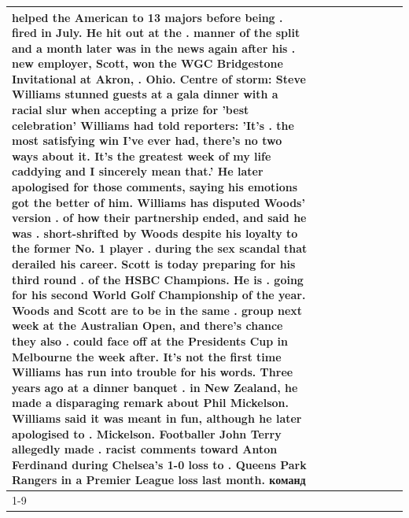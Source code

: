 \begin{table}[H]
\begin{tabular}{lllrlllll}
helped the American to 13 majors before being . fired in July. He hit out at the . manner of the split and a month later was in the news again after his . new employer, Scott, won the WGC Bridgestone Invitational at Akron, . Ohio. Centre of storm: Steve Williams stunned guests at a gala dinner with a racial slur when accepting a prize for 'best celebration' Williams had told reporters: 'It's . the most satisfying win I've ever had, there's no two ways about it. It's the greatest week of my life caddying and I sincerely mean that.' He later apologised for those comments, saying his emotions got the better of him. Williams has disputed Woods' version . of how their partnership ended, and said he was . short-shrifted by Woods despite his loyalty to the former No. 1 player . during the sex scandal that derailed his career. Scott is today preparing for his third round . of the HSBC Champions. He is . going for his second World Golf Championship of the year. Woods and Scott are to be in the same . group next week at the Australian Open, and there's chance they also . could face off at the Presidents Cup in Melbourne the week after. It's not the first time Williams has run into trouble for his words. Three years ago at a dinner banquet . in New Zealand, he made a disparaging remark about Phil Mickelson. Williams said it was meant in fun, although he later apologised to . Mickelson. Footballer John Terry allegedly made . racist comments toward Anton Ferdinand during Chelsea's 1-0 loss to . Queens Park Rangers in a Premier League loss last month. команд \\
\cline{1-9}

\end{tabular}
\end{table}
